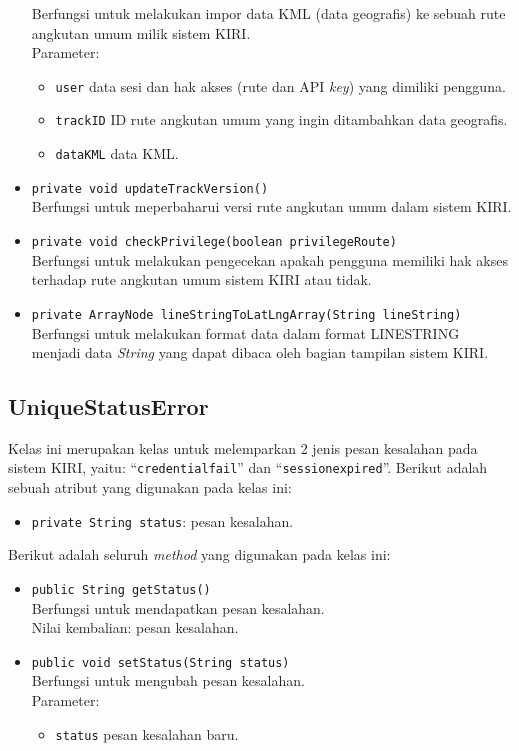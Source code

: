 \begin{itemize}
	Berfungsi untuk melakukan impor data KML (data geografis) ke sebuah rute angkutan umum milik sistem KIRI.\\
	Parameter:
	\begin{itemize}
		\item \texttt{user} data sesi dan hak akses (rute dan API \textit{key}) yang dimiliki pengguna.
		\item \texttt{trackID} ID rute angkutan umum yang ingin ditambahkan data geografis.
		\item \texttt{dataKML} data KML.
	\end{itemize}
	\item \texttt{private void updateTrackVersion()}\\
	Berfungsi untuk meperbaharui versi rute angkutan umum dalam sistem KIRI.
	\item \texttt{private void checkPrivilege(boolean privilegeRoute)}\\
	Berfungsi untuk melakukan pengecekan apakah pengguna memiliki hak akses terhadap rute angkutan umum sistem KIRI atau tidak.
	\item \texttt{private ArrayNode lineStringToLatLngArray(String lineString)}\\
	Berfungsi untuk melakukan format data dalam format LINESTRING menjadi data \textit{String} yang dapat dibaca oleh bagian tampilan sistem KIRI.
\end{itemize}

\subsection{UniqueStatusError}
\label{sec:uniquestatuserror}
Kelas ini merupakan kelas untuk melemparkan 2 jenis pesan kesalahan pada sistem KIRI, yaitu: ``\texttt{credentialfail}'' dan ``\texttt{sessionexpired}''. Berikut adalah sebuah atribut yang digunakan pada kelas ini:
\begin{itemize}
	\item \texttt{private String status}: pesan kesalahan.
\end{itemize}
Berikut adalah seluruh \textit{method} yang digunakan pada kelas ini:
\begin{itemize}
	\item \texttt{public String getStatus()}\\
	Berfungsi untuk mendapatkan pesan kesalahan.\\
	Nilai kembalian: pesan kesalahan.
	\item \texttt{public void setStatus(String status)}\\
	Berfungsi untuk mengubah pesan kesalahan.\\
	Parameter:
	\begin{itemize}
		\item \texttt{status} pesan kesalahan baru.
	\end{itemize}
\end{itemize}

